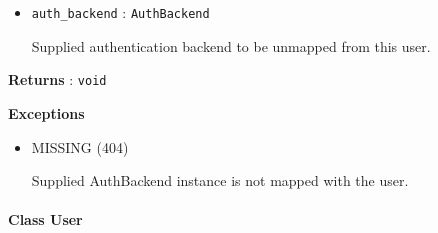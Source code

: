 \documentclass{article}%
\begin{document}
\begin{enumerate}
\normalsize%
\begin{itemize}%
\item%
\verb|auth_backend|%
: %
\verb|AuthBackend|%
\par%
Supplied authentication backend to be unmapped from this user.%
\end{itemize}%
\small%
\textbf{Returns}%
\normalsize%
: %
\verb|void|%
\par%
\small%
\textbf{Exceptions}%
\normalsize%
\begin{itemize}%
\item%
MISSING (404)%
\par%
Supplied AuthBackend instance is not mapped with the user.%
\end{itemize}%
\end{enumerate}%
\hypertarget{ID:1177272789}{}%
\paragraph{Class User}%
\end{document}
